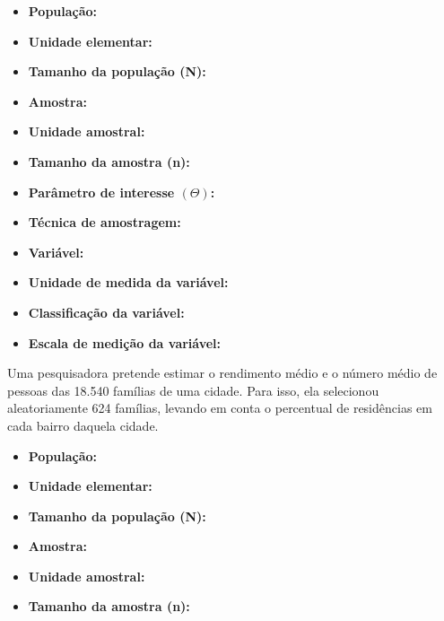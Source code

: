 \begin{enumerate}
	\begin{itemize}	
		\item \textbf{População:}~
		
		\item \textbf{Unidade elementar:}~
		
		\item \textbf{Tamanho da população (N):}~
		
		\item \textbf{Amostra:}~
		
		\item \textbf{Unidade amostral:}~
		
		\item \textbf{Tamanho da amostra (n):}~
		
		\item \textbf{Parâmetro de interesse $\left(\varTheta\right)$:}~
		
		\item \textbf{Técnica de amostragem:}~
		
		\item \textbf{Variável:}~
		
		\item \textbf{Unidade de medida da variável:}~
		
		\item \textbf{Classificação da variável:}~
		
		\item \textbf{Escala de medição da variável:}~
	\end{itemize}

	\subitem Uma pesquisadora pretende estimar o rendimento médio e o número médio de pessoas
das 18.540 famílias de uma cidade. Para isso, ela selecionou aleatoriamente 624
famílias, levando em conta o percentual de residências em cada bairro daquela cidade.
	
	\begin{itemize}	
		\item \textbf{População:}~
		
		\item \textbf{Unidade elementar:}~
		
		\item \textbf{Tamanho da população (N):}~
		
		\item \textbf{Amostra:}~
		
		\item \textbf{Unidade amostral:}~
		
		\item \textbf{Tamanho da amostra (n):}~
		

\end{itemize}
\end{enumerate}

